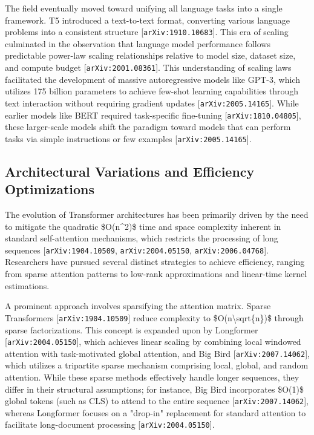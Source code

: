 \documentclass[11pt]{article}
\begin{document}
The field eventually moved toward unifying all language tasks into a single framework. T5 introduced a text-to-text format, converting various language problems into a consistent structure [\texttt{arXiv:1910.10683}]. This era of scaling culminated in the observation that language model performance follows predictable power-law scaling relationships relative to model size, dataset size, and compute budget [\texttt{arXiv:2001.08361}]. This understanding of scaling laws facilitated the development of massive autoregressive models like GPT-3, which utilizes 175 billion parameters to achieve few-shot learning capabilities through text interaction without requiring gradient updates [\texttt{arXiv:2005.14165}]. While earlier models like BERT required task-specific fine-tuning [\texttt{arXiv:1810.04805}], these larger-scale models shift the paradigm toward models that can perform tasks via simple instructions or few examples [\texttt{arXiv:2005.14165}].

\subsection{Architectural Variations and Efficiency Optimizations}

The evolution of Transformer architectures has been primarily driven by the need to mitigate the quadratic \$O(n\textasciicircum{}2)\$ time and space complexity inherent in standard self-attention mechanisms, which restricts the processing of long sequences [\texttt{arXiv:1904.10509}, \texttt{arXiv:2004.05150}, \texttt{arXiv:2006.04768}]. Researchers have pursued several distinct strategies to achieve efficiency, ranging from sparse attention patterns to low-rank approximations and linear-time kernel estimations.

A prominent approach involves sparsifying the attention matrix. Sparse Transformers [\texttt{arXiv:1904.10509}] reduce complexity to \$O(n\textbackslash{}sqrt\{n\})\$ through sparse factorizations. This concept is expanded upon by Longformer [\texttt{arXiv:2004.05150}], which achieves linear scaling by combining local windowed attention with task-motivated global attention, and Big Bird [\texttt{arXiv:2007.14062}], which utilizes a tripartite sparse mechanism comprising local, global, and random attention. While these sparse methods effectively handle longer sequences, they differ in their structural assumptions; for instance, Big Bird incorporates \$O(1)\$ global tokens (such as CLS) to attend to the entire sequence [\texttt{arXiv:2007.14062}], whereas Longformer focuses on a "drop-in" replacement for standard attention to facilitate long-document processing [\texttt{arXiv:2004.05150}].
\end{document}
